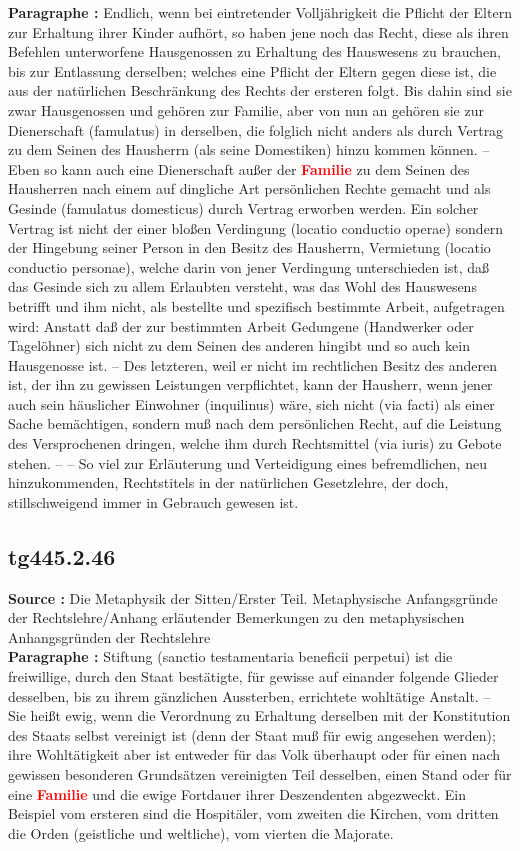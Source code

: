 \documentclass[a4paper,12pt,twoside]{book}
\newcommand{\match}[1]{\textcolor{red}{\textbf{#1}}}
\begin{document}
	\textbf{Paragraphe : }Endlich, wenn bei eintretender Volljährigkeit die Pflicht der Eltern zur Erhaltung ihrer Kinder aufhört, so haben jene noch das Recht, diese als ihren Befehlen unterworfene Hausgenossen zu Erhaltung des Hauswesens zu brauchen, bis zur Entlassung derselben; welches eine Pflicht der Eltern gegen diese ist, die aus der natürlichen Beschränkung des Rechts der ersteren folgt. Bis dahin sind sie zwar Hausgenossen und gehören zur Familie, aber von nun an gehören sie zur Dienerschaft (famulatus) in derselben, die folglich nicht anders als durch Vertrag zu dem Seinen des Hausherrn (als seine Domestiken) hinzu kommen können. – Eben so kann auch eine Dienerschaft 
	außer der \match{Familie} zu dem Seinen des Hausherren nach einem auf dingliche Art persönlichen Rechte gemacht und als Gesinde (famulatus domesticus) durch Vertrag erworben werden. Ein solcher Vertrag ist nicht der einer bloßen Verdingung (locatio conductio operae) sondern der Hingebung seiner Person in den Besitz des Hausherrn, Vermietung (locatio conductio personae), welche darin von jener Verdingung unterschieden ist, daß das Gesinde sich zu allem Erlaubten versteht, was das Wohl des Hauswesens betrifft und ihm nicht, als bestellte und spezifisch bestimmte Arbeit, aufgetragen wird: Anstatt daß der zur bestimmten Arbeit Gedungene (Handwerker oder Tagelöhner) sich nicht zu dem Seinen des anderen hingibt und so auch kein Hausgenosse ist. – Des letzteren, weil er nicht im rechtlichen Besitz des anderen ist, der ihn zu gewissen Leistungen verpflichtet, kann der Hausherr, wenn jener auch sein häuslicher Einwohner (inquilinus) wäre, sich nicht (via facti) als einer Sache bemächtigen, sondern muß nach dem persönlichen Recht, auf die Leistung des Versprochenen dringen, welche ihm durch Rechtsmittel (via iuris) zu Gebote stehen. – – So viel zur Erläuterung und Verteidigung eines befremdlichen, neu hinzukommenden, Rechtstitels in der natürlichen Gesetzlehre, der doch, stillschweigend immer in Gebrauch gewesen ist. 
	
	\subsection*{tg445.2.46} 
	\textbf{Source : }Die Metaphysik der Sitten/Erster Teil. Metaphysische Anfangsgründe der Rechtslehre/Anhang erläutender Bemerkungen zu den metaphysischen Anhangsgründen der Rechtslehre\\  
	
	\textbf{Paragraphe : }
	Stiftung (sanctio testamentaria beneficii perpetui) ist die freiwillige, durch den Staat bestätigte, für gewisse auf einander folgende Glieder desselben, bis zu ihrem gänzlichen Aussterben, errichtete wohltätige Anstalt. – Sie heißt ewig, wenn die Verordnung zu Erhaltung derselben mit der Konstitution des Staats selbst vereinigt ist (denn der Staat muß für ewig angesehen werden); ihre Wohltätigkeit aber ist entweder für das Volk überhaupt oder für einen nach gewissen besonderen Grundsätzen vereinigten Teil desselben, einen Stand oder für eine \match{Familie} und die ewige Fortdauer ihrer Deszendenten abgezweckt. Ein Beispiel vom ersteren sind die Hospitäler, vom zweiten die Kirchen, vom dritten die Orden (geistliche und weltliche), vom vierten die Majorate. 
	
\end{document}
